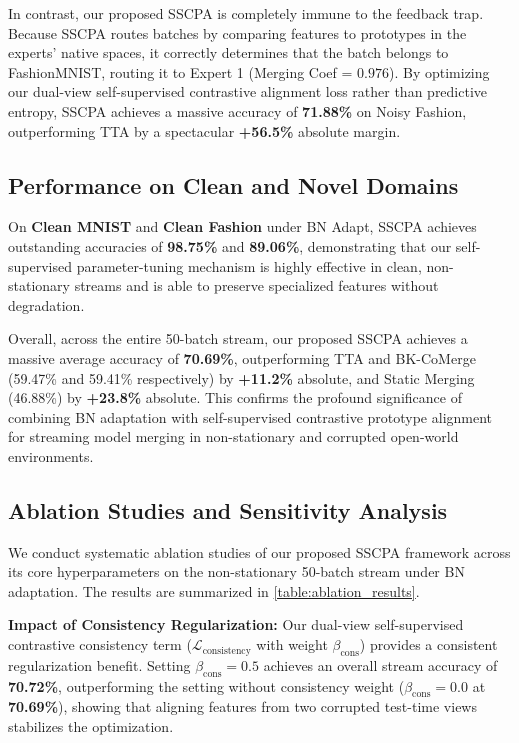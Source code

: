 \documentclass{article}
\theoremstyle{plain}
\theoremstyle{definition}
\theoremstyle{remark}
\begin{document}
In contrast, our proposed SSCPA is completely immune to the feedback trap. Because SSCPA routes batches by comparing features to prototypes in the experts' native spaces, it correctly determines that the batch belongs to FashionMNIST, routing it to Expert 1 (Merging Coef = $0.976$). By optimizing our dual-view self-supervised contrastive alignment loss rather than predictive entropy, SSCPA achieves a massive accuracy of \textbf{71.88\%} on Noisy Fashion, outperforming TTA by a spectacular \textbf{+56.5\%} absolute margin.

\subsection{Performance on Clean and Novel Domains}
On \textbf{Clean MNIST} and \textbf{Clean Fashion} under BN Adapt, SSCPA achieves outstanding accuracies of \textbf{98.75\%} and \textbf{89.06\%}, demonstrating that our self-supervised parameter-tuning mechanism is highly effective in clean, non-stationary streams and is able to preserve specialized features without degradation.

Overall, across the entire 50-batch stream, our proposed SSCPA achieves a massive average accuracy of \textbf{70.69\%}, outperforming TTA and BK-CoMerge (59.47\% and 59.41\% respectively) by \textbf{+11.2\%} absolute, and Static Merging (46.88\%) by \textbf{+23.8\%} absolute. This confirms the profound significance of combining BN adaptation with self-supervised contrastive prototype alignment for streaming model merging in non-stationary and corrupted open-world environments.

\subsection{Ablation Studies and Sensitivity Analysis}
\label{subsec:ablations}
We conduct systematic ablation studies of our proposed SSCPA framework across its core hyperparameters on the non-stationary 50-batch stream under BN adaptation. The results are summarized in \cref{table:ablation_results}.

\textbf{Impact of Consistency Regularization:} Our dual-view self-supervised contrastive consistency term ($\mathcal{L}_{\text{consistency}}$ with weight $\beta_{\text{cons}}$) provides a consistent regularization benefit. Setting $\beta_{\text{cons}} = 0.5$ achieves an overall stream accuracy of \textbf{70.72\%}, outperforming the setting without consistency weight ($\beta_{\text{cons}} = 0.0$ at \textbf{70.69\%}), showing that aligning features from two corrupted test-time views stabilizes the optimization.
\end{document}
